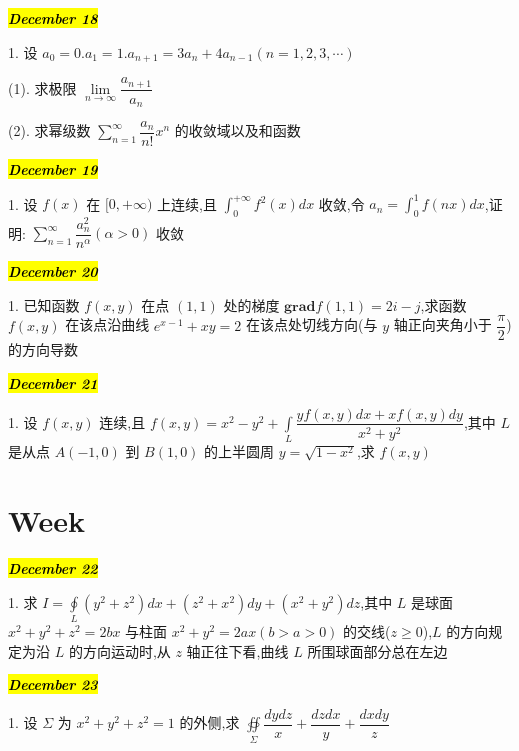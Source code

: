 \hl{\textbf{\textit{December 18}}}

1. 设 $a_{0}=0.a_{1}=1.a_{n+1}=3a_{n}+4a_{n-1}(n=1,2,3,\cdots)$

(1). 求极限 $\lim\limits_{n\to\infty}\dfrac{a_{n+1}}{a_{n}}$

(2). 求幂级数 $\sum\limits_{n=1}^{\infty}\dfrac{a_{n}}{n!}x^{n}$ 的收敛域以及和函数
\begin{solution}
	
\end{solution}

\hl{\textbf{\textit{December 19}}}

1. 设 $f(x)$ 在 $[0,+\infty)$ 上连续,且 $\int_{0}^{+\infty}f^{2}(x)dx$ 收敛,令 $a_{n}=\int_{0}^{1}f(nx)dx$,证明: $\sum\limits_{n=1}^{\infty}\dfrac{a_{n}^{2}}{n^{\alpha}}(\alpha>0)$ 收敛
\begin{solution}
	
\end{solution}

\hl{\textbf{\textit{December 20}}}

1. 已知函数 $f(x,y)$ 在点 $(1,1)$ 处的梯度 $\mathbf{grad} f(1,1)=2i-j$,求函数 $f(x,y)$ 在该点沿曲线 $e^{x-1}+xy=2$ 在该点处切线方向(与 $y$ 轴正向夹角小于 $\dfrac{\pi}{2}$)的方向导数
\begin{solution}
	
\end{solution}

\hl{\textbf{\textit{December 21}}}

1. 设 $f(x,y)$ 连续,且 $f(x,y)=x^{2}-y^{2}+\int\limits_{L}\dfrac{yf(x,y)dx+xf(x,y)dy}{x^{2}+y^{2}}$,其中 $L$ 是从点 $A(-1,0)$ 到 $B(1,0)$ 的上半圆周 $y=\sqrt{1-x^{2}}$,求 $f(x,y)$
\begin{solution}
	
\end{solution}

\section{Week }
\hl{\textbf{\textit{December 22}}}

1. 求 $I=\oint\limits_{L}(y^{2}+z^{2})dx+(z^{2}+x^{2})dy+(x^{2}+y^{2})dz$,其中 $L$ 是球面 $x^{2}+y^{2}+z^{2}=2bx$ 与柱面 $x^{2}+y^{2}=2ax(b>a>0)$ 的交线($z\geq 0$),$L$ 的方向规定为沿 $L$ 的方向运动时,从 $z$ 轴正往下看,曲线 $L$ 所围球面部分总在左边
\begin{solution}
	
\end{solution}

\hl{\textbf{\textit{December 23}}}

1. 设 $\Sigma$ 为 $x^{2}+y^{2}+z^{2}=1$ 的外侧,求 $\oiint\limits_{\Sigma}\dfrac{dydz}{x}+\dfrac{dzdx}{y}+\dfrac{dxdy}{z}$
\begin{solution}
	
\end{solution}
